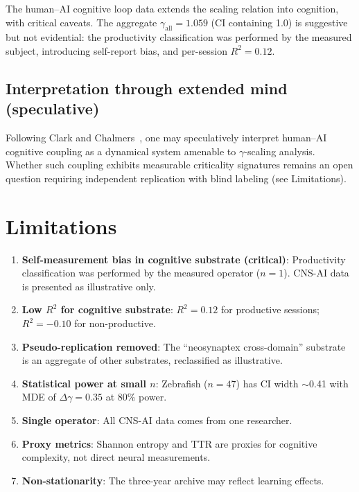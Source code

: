 \documentclass[11pt,a4paper,twocolumn]{article}
\begin{document}
The human--AI cognitive loop data extends the scaling relation into cognition, with critical caveats. The aggregate $\gamma_{\text{all}} = 1.059$ (CI containing 1.0) is suggestive but not evidential: the productivity classification was performed by the measured subject, introducing self-report bias, and per-session $R^2 = 0.12$.

\subsection{Interpretation through extended mind (speculative)}

Following Clark and Chalmers~\cite{clark1998}, one may speculatively interpret human--AI cognitive coupling as a dynamical system amenable to $\gamma$-scaling analysis. Whether such coupling exhibits measurable criticality signatures remains an open question requiring independent replication with blind labeling (see Limitations).

\section{Limitations}

\begin{enumerate}
\item \textbf{Self-measurement bias in cognitive substrate (critical)}: Productivity classification was performed by the measured operator ($n = 1$). CNS-AI data is presented as illustrative only.

\item \textbf{Low $R^2$ for cognitive substrate}: $R^2 = 0.12$ for productive sessions; $R^2 = -0.10$ for non-productive.

\item \textbf{Pseudo-replication removed}: The ``neosynaptex cross-domain'' substrate is an aggregate of other substrates, reclassified as illustrative.

\item \textbf{Statistical power at small $n$}: Zebrafish ($n = 47$) has CI width $\sim$0.41 with MDE of $\Delta\gamma = 0.35$ at 80\% power.

\item \textbf{Single operator}: All CNS-AI data comes from one researcher.

\item \textbf{Proxy metrics}: Shannon entropy and TTR are proxies for cognitive complexity, not direct neural measurements.

\item \textbf{Non-stationarity}: The three-year archive may reflect learning effects.
\end{enumerate}
\end{document}
